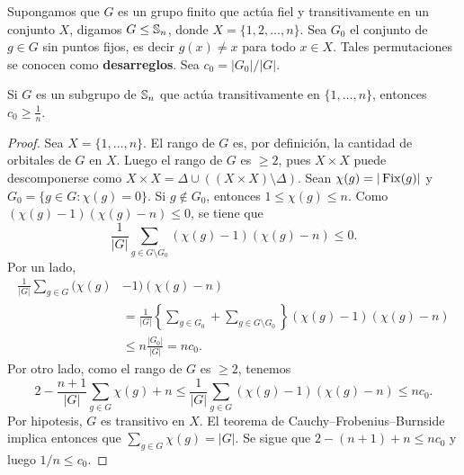 Supongamos que $G$ es un grupo finito que actúa fiel y transitivamente en un conjunto $X$,
digamos $G\leq\mathbb{S}_n$, donde $X=\{1,2,\dots,n\}$. Sea 
$G_0$ el conjunto de $g\in G$ sin puntos fijos, es decir $g(x)\ne x$ para todo $x\in X$. 
Tales permutaciones se conocen como \textbf{desarreglos}. 
Sea $c_0=|G_0|/|G|$. 

\begin{theorem}
Si $G$ es un subgrupo de $\mathbb{S}_n$ que actúa transitivamente en $\{1,\dots,n\}$, entonces $c_0\geq\frac{1}{n}$.
\end{theorem}

\begin{proof}
Sea $X=\{1,\dots,n\}$. El rango de $G$ es, por definición, la cantidad de orbitales de $G$ en $X$. Luego 
el rango de $G$ es $\geq2$, pues $X\times X$ puede descomponerse como 
$X\times X=\Delta\cup\left((X\times X)\setminus\Delta\right)$. 
Sean $\chi(g)=|\operatorname{Fix}(g)|$ y $G_0=\{g\in G:\chi(g)=0\}$. Si $g\not\in G_0$, entonces $1\leq\chi(g)\leq n$. Como 
$(\chi(g)-1)(\chi(g)-n)\leq 0$,
se tiene que 
\[
\frac{1}{|G|}\sum_{g\in G\setminus G_0}(\chi(g)-1)(\chi(g)-n)\leq 0.
\]
Por un lado, 
\begin{align*}
\frac{1}{|G|}\sum_{g\in G}(\chi(g)&-1)(\chi(g)-n)\\
&=\frac{1}{|G|}\left\{\sum_{g\in G_0}+\sum_{g\in G\setminus G_0}\right\}(\chi(g)-1)(\chi(g)-n)\\
&\leq n\frac{|G_0|}{|G|}=nc_0.
\end{align*}
Por otro lado, como el rango de $G$ es $\geq2$, tenemos 
\begin{equation}
    \label{eq:CameronCohen}
    2-\frac{n+1}{|G|}\sum_{g\in G}\chi(g)+n\leq 
    \frac{1}{|G|}\sum_{g\in G}(\chi(g)-1)(\chi(g)-n)\leq nc_0.
\end{equation}
Por hipotesis, $G$ es transitivo en $X$. El teorema de Cauchy--Frobenius--Burnside implica entonces que 
$\sum_{g\in G}\chi(g)=|G|$. Se sigue que $2-(n+1)+n\leq nc_0$ y luego $1/n\leq c_0$. 
\end{proof}

